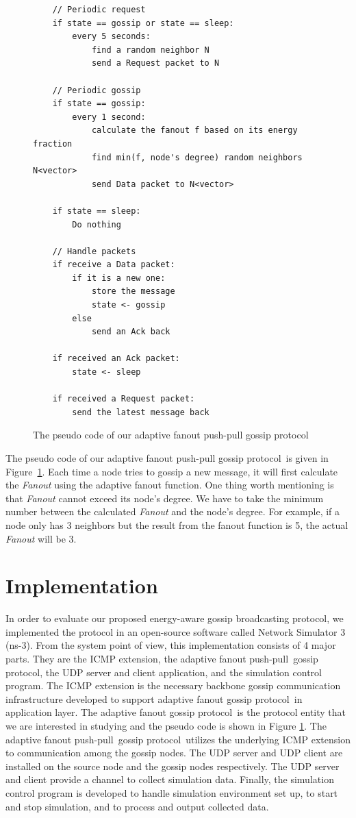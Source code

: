 \documentclass[onehalf,11pt]{beavtex}
\newcommand{\gp}{gossip protocol}
\newcommand{\msg}{message}
\newcommand{\pp}{push-pull}
\begin{document}
\begin{figure}[!htbp]
	\centering
	\begin{Verbatim}
	// Periodic request 
	if state == gossip or state == sleep:
		every 5 seconds:
			find a random neighbor N
			send a Request packet to N
	
	// Periodic gossip	
	if state == gossip:
		every 1 second:
			calculate the fanout f based on its energy fraction
			find min(f, node's degree) random neighbors N<vector>
			send Data packet to N<vector>
	
	if state == sleep:
		Do nothing
	
	// Handle packets
	if receive a Data packet:
		if it is a new one:
			store the message
			state <- gossip
		else
			send an Ack back
	
	if received an Ack packet:
		state <- sleep
	
	if received a Request packet:
		send the latest message back
	\end{Verbatim}
	\caption{The pseudo code of our adaptive fanout push-pull \gp}
	\label{fig:gossip}
\end{figure}
	
The pseudo code of our adaptive fanout push-pull \gp ~is given in Figure~\ref{fig:gossip}. Each time a node tries to gossip a new \msg, it will first calculate the \emph{Fanout} using the adaptive fanout function. One thing worth mentioning is that \emph{Fanout} cannot exceed its node's degree. We have to take the minimum number between the calculated \emph{Fanout} and the node's degree. For example, if a node only has 3 neighbors but the result from the fanout function is 5, the actual \emph{Fanout} will be 3.


\chapter{Implementation}
\label{Chapter4}

In order to evaluate our proposed energy-aware gossip broadcasting protocol, we implemented the protocol in an open-source software called Network Simulator 3 (ns-3). From the system point of view, this implementation consists of 4 major parts. They are the ICMP extension, the adaptive fanout \pp ~\gp, the UDP server and client application, and the simulation control program. The ICMP extension is the necessary backbone gossip communication infrastructure developed to support adaptive fanout \gp ~in application layer. The adaptive fanout \gp ~is the protocol entity that we are interested in studying and the pseudo code is shown in Figure \ref{fig:gossip}. The adaptive fanout \pp ~\gp ~utilizes the underlying ICMP extension to communication among the gossip nodes. The UDP server and UDP client are installed on the source node and the gossip nodes respectively. The UDP server and client provide a channel to collect simulation data. Finally, the simulation control program is developed to handle simulation environment set up, to start and stop simulation, and to process and output collected data.
\end{document}
